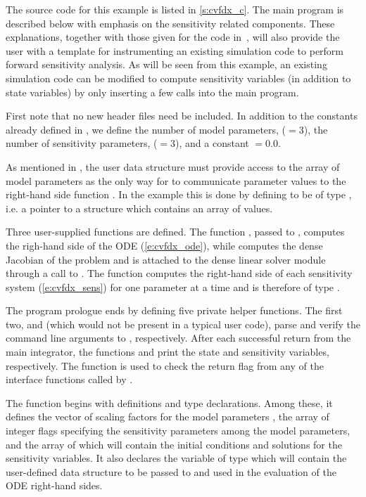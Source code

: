 The source code for this example is listed in \A\ref{s:cvfdx_c}. The main program is described 
below with emphasis on the sensitivity related components. 
These explanations, together with those given for the code 
in~\cite{cvode2.2.0_ex}, will also provide the user with a template for instrumenting 
an existing simulation code to perform forward sensitivity analysis.
As will be seen from this example, an existing simulation code can be modified to compute 
sensitivity variables (in addition to state variables) by only inserting a few {\cvodes} 
calls into the main program. 

First note that no new header files need be included. In addition to the constants already
defined in , we define the number of model parameters,  ($=3$),
the number of sensitivity parameters,  ($=3$), and a constant  $=0.0$. 

As mentioned in , the user data
structure  must provide access to the array of model parameters 
as the only way for {\cvodes} to communicate parameter values to the right-hand side 
function . In the  example this is done by defining  to be 
of type , i.e. a pointer to a structure which contains an array of 
  values.

Three user-supplied functions are defined. The function , passed to
, computes the righ-hand side of the ODE (\ref{e:cvfdx_ode}), while
 computes the dense Jacobian of the problem and is attached to the
dense linear solver module {\cvdense} through a call to .
The function  computes the right-hand side of each sensitivity system
(\ref{e:cvfdx_sens}) for one parameter at a time and is therefore of type
.

The program prologue ends by defining five private helper functions. 
The first two,  and  (which would not be present in 
a typical user code), parse and verify the command line arguments to , respectively.
After each successful return from the main {\cvodes} integrator, the functions 
 and  print the state and sensitivity variables,
respectively. 
The function  is used to check the return flag from any of the
{\cvodes} interface functions called by .

The  function begins with definitions and type declarations. 
Among these, it defines the vector  of  scaling factors for
the model parameters , the array  of integer flags specifying
the sensitivity parameters among the model parameters, and the array  of 
 which will contain the initial conditions and solutions for the sensitivity
variables. It also declares the variable  of type  
which will contain the user-defined data structure to be passed to {\cvodes} and used in the 
evaluation of the ODE right-hand sides.

